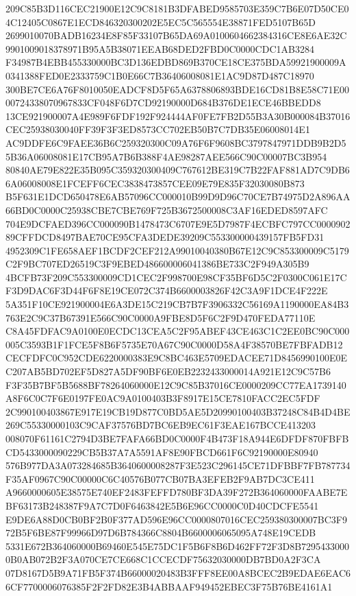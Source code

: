 \documentclass[UTF8,fontset=fandol,zihao=-4,a4paper]{ctexart}
\begin{document}
{{209C85B3D116CEC21900E12C9C8181B3DFABED9585703E359C7B6E07D50CE04C12405C0867E1ECD846320300202E5EC5C565554E38871FED5107B65D
2699010070BADB16234E8F85F33107B65DA69A0100604662384316CE8E6AE32C9901009018378971B95A5B38071EEAB68DED2FBD0C0000CDC1AB3284
F34987B4EBB455330000BC3D136EDBD869B370CE18CE375BDA59921900009A0341388FED0E2333759C1B0E66C7B36406008081E1AC9D87D487C18970
300BE7CE6A76F8010050EADCF8D5F65A6378806893BDE16CD81B8E58C71E0000724338070967833CF048F6D7CD92190000D684B376DE1ECE46BBEDD8
13CE921900007A4E989F6FDF192F924444AF0FE7FB2D55B3A30B000084B37016CEC25938030040FF39F3F3ED8573CC702EB50B7C7DB35E06008014E1
AC9DDFE6C9FAEE36B6C259320300C09A76F6F9608BC3797847971DDB9B2D55B36A06008081E17CB95A7B6B388F4AE98287AEE566C90C00007BC3B954
80840AE79E822E35B095C359320300409C767612BE319C7B22FAF881AD7C9DB66A06008008E1FCEFF6CEC3838473857CEE09E79E835F32030080B873
B5F631E1DCD650478E6AB57096CC000010B99D9D96C70CE7B74975D2A896AA66BD0C0000C25938CBE7CBE769F725B3672500008C3AF16EDED8597AFC
704E9DCFAED396CC000090B1478473C6707E9E5D7987F4ECBFC797CC000090289CFFDCD8497BAE70CE95CFA3DEDE39209C553300000439157FB5FD31
4952309C1FE658AEF1BCDF2CEF212A99010040380B67E12C9C853300009C5179C2F9BC707ED26519C3F9EBED486600006041386BE733C2F949A305B9
4BCFB73F209C553300009CD1CEC2F998700E98CF35BF6D5C2F0300C061E17CF3D9DAC6F3D44F6F8E19CE072C374B6600003826F42C3A9F1DCE4F222E
5A351F10CE921900004E6A3DE15C219CB7B7F3906332C56169A1190000EA84B3763E2C9C37B67391E566C90C0000A9FBE8D5F6C2F9D470FEDA77110E
C8A45FDFAC9A0100E0ECDC13CEA5C2F95ABEF43CE463C1C2EE0BC90C000005C3593B1F1FCE5F8B6F5735E70A67C90C0000D58A4F38570BE7FBFADB12
CECFDFC0C952CDE6220000383E9C8BC463E5709EDACEE71D8456990100E0EC207AB5BD702EF5D827A5DF90BF6E0EB2232433000014A921E12C9C57B6
F3F35B7BF5B5688BF78264060000E12C9C85B37016CE0000209CC77EA1739140A8F6C0C7F6E0197FE0AC9A0100403B3F8917E15CE7810FACC2EC5FDF
2C990100403867E917E19CB19D877C0BD5AE5D20990100403B37248C84B4D4BE269C55330000103C9CAF37576BD7BC6EB9EC61F3EAE167BCCE413203
008070F61161C2794D3BE7FAFA66BD0C0000F4B473F18A944E6DFDF870FBFBCD5433000090229CB5B37A7A5591AF8E90FBCD661F6C92190000E80940
576B977DA3A073284685B3640600008287F3E523C296145CE71DFBBF7FB787734F35AF0967C90C00000C6C40576B077CB07BA3EFEB2F9AB7DC3CE411
A9660000605E38575E740EF2483FEFFD780BF3DA39F272B364060000FAABE7EBF63173B248387F9A7C7D0F6463842E5B6E96CC0000C0D40CDCFE5541
E9DE6A88D0CB0BF2B0F377AD596E96CC0000807016CEC259380300007BC3F972B5F6BE87F99966D97D6B784366C8804B6600006065095A748E19CEDB
5331E672B364060000B69460E545E75DC1F5B6F8B6D462FF72F3D8B72954330000B0AB072B2F3A070CE7CE668C1CCECDF75632030000DB7BD0A2F3CA
07D8167D5B9A71FB5F374B66000020483B3FFF8EE00A8BCEC2B9EDAE6EAC66CF7700006076385F2F2FD82E3B4ABBAAF949452EBEC3F75B76BE4161A1
}}
\end{document}
